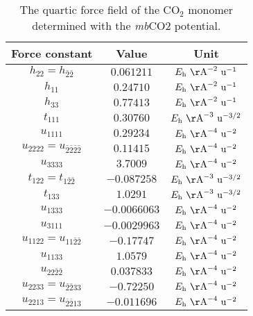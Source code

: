 \documentclass[aip,jcp,showpacs,superscriptaddress,groupedaddress]{revtex4-1}  %
\begin{document}
\begin{table}[H]
\centering
\caption{The quartic force field of the CO$_2$ monomer determined with the \emph{mb}CO2 potential.}
\label{table:qff_monomer}
\begin{ruledtabular}
\begin{tabular}{ccc}
Force constant & Value        & Unit         \\
\hline \Tstrut
$h_{22}=h_{\bar{2}\bar{2}}$        & $0.061211$  & $E_{\rm h}\ {\rm \AA}^{-2}\ {\rm u}^{-1}$   \\
$h_{11}$            & $0.24710$   & $E_{\rm h}\ {\rm \AA}^{-2}\ {\rm u}^{-1}$   \\
$h_{33}$            & $0.77413$  & $E_{\rm h}\ {\rm \AA}^{-2}\ {\rm u}^{-1}$   \\
$t_{111}$           & $0.30760$   & $E_{\rm h}\ {\rm \AA}^{-3}\ {\rm u}^{-3/2}$ \\
$u_{1111}$          & $0.29234$  & $E_{\rm h}\ {\rm \AA}^{-4}\ {\rm u}^{-2}$ \\
$u_{2222}=u_{\bar{2}\bar{2}\bar{2}\bar{2}}$    & $0.11415$  & $E_{\rm h}\ {\rm \AA}^{-4}\ {\rm u}^{-2}$ \\
$u_{3333}$          & $3.7009$  & $E_{\rm h}\ {\rm \AA}^{-4}\ {\rm u}^{-2}$    \\
$t_{122}=t_{1\bar{2}\bar{2}}$      & $-0.087258$ & $E_{\rm h}\ {\rm \AA}^{-3}\ {\rm u}^{-3/2}$ \\
$t_{133}$           & $1.0291$  & $E_{\rm h}\ {\rm \AA}^{-3}\ {\rm u}^{-3/2}$ \\
$u_{1333}$          & $-0.0066063$ & $E_{\rm h}\ {\rm \AA}^{-4}\ {\rm u}^{-2}$    \\
$u_{3111}$          & $-0.0029963$ & $E_{\rm h}\ {\rm \AA}^{-4}\ {\rm u}^{-2}$    \\
$u_{1122}=u_{11\bar{2}\bar{2}}$    & $-0.17747$ & $E_{\rm h}\ {\rm \AA}^{-4}\ {\rm u}^{-2}$  \\
$u_{1133}$          & $1.0579$  & $E_{\rm h}\ {\rm \AA}^{-4}\ {\rm u}^{-2}$    \\
$u_{22\bar{2}\bar{2}}$          & $0.037833$  & $E_{\rm h}\ {\rm \AA}^{-4}\ {\rm u}^{-2}$    \\
$u_{2233}=u_{\bar{2}\bar{2}33}$    & $-0.72250$ & $E_{\rm h}\ {\rm \AA}^{-4}\ {\rm u}^{-2}$    \\
$u_{2213}=u_{\bar{2}\bar{2}13}$    & $-0.011696$ & $E_{\rm h}\ {\rm \AA}^{-4}\ {\rm u}^{-2}$   
\end{tabular}
\end{ruledtabular}
\end{table}
\end{document}
